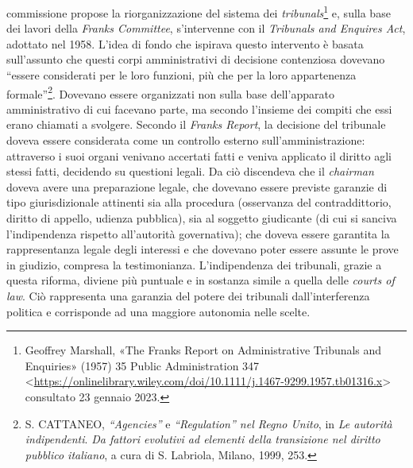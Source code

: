 \documentclass[12pt,it,a4paper,]{report}
\begin{document}
commissione propose la riorganizzazione del sistema dei
\emph{tribunals}\footnote{{Geoffrey Marshall, {«The {Franks Report} on
  {Administrative Tribunals} and {Enquiries}»} (1957) 35 Public
  Administration 347
  \textless{}\url{https://onlinelibrary.wiley.com/doi/10.1111/j.1467-9299.1957.tb01316.x}\textgreater{}
  consultato 23 gennaio 2023.}} e, sulla base dei lavori della
\emph{Franks Committee}, s'intervenne con il \emph{Tribunals and
Enquires Act}, adottato nel 1958. L'idea di fondo che ispirava questo
intervento è basata sull'assunto che questi corpi amministrativi di
decisione contenziosa dovevano ``essere considerati per le loro
funzioni, più che per la loro appartenenza formale''\footnote{S.
  CATTANEO, \emph{``Agencies''} e \emph{``Regulation'' nel Regno Unito},
  in \emph{Le autorità indipendenti}. \emph{Da fattori evolutivi ad
  elementi della transizione nel diritto pubblico italiano}, a cura di
  S. Labriola, Milano, 1999, 253.}. Dovevano essere organizzati non
sulla base dell'apparato amministrativo di cui facevano parte, ma
secondo l'insieme dei compiti che essi erano chiamati a svolgere.
Secondo il \emph{Franks Report}, la decisione del tribunale doveva
essere considerata come un controllo esterno sull'amministrazione:
attraverso i suoi organi venivano accertati fatti e veniva applicato il
diritto agli stessi fatti, decidendo su questioni legali. Da ciò
discendeva che il \emph{chairman} doveva avere una preparazione legale,
che dovevano essere previste garanzie di tipo giurisdizionale attinenti
sia alla procedura (osservanza del contraddittorio, diritto di appello,
udienza pubblica), sia al soggetto giudicante (di cui si sanciva
l'indipendenza rispetto all'autorità governativa); che doveva essere
garantita la rappresentanza legale degli interessi e che dovevano poter
essere assunte le prove in giudizio, compresa la testimonianza.
L'indipendenza dei tribunali, grazie a questa riforma, diviene più
puntuale e in sostanza simile a quella delle \emph{courts of law}. Ciò
rappresenta una garanzia del potere dei tribunali dall'interferenza
politica e corrisponde ad una maggiore autonomia nelle scelte.
\end{document}
